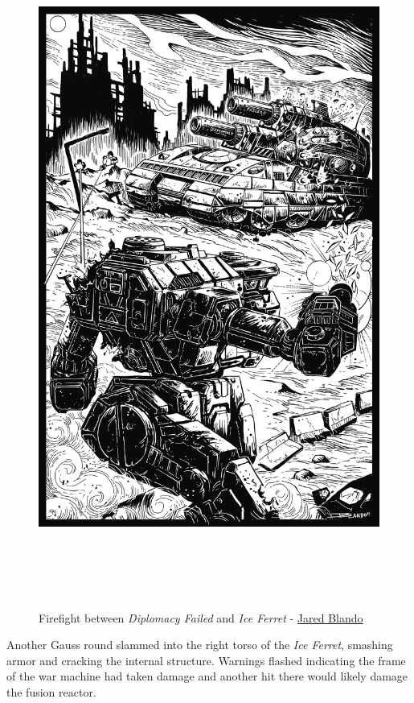 \begin{figure}[!h]
  \centering
  \href{https://jaredblando.com/}{\includegraphics[alt='Demolisher and Ice Ferret fighting', width=5.5in, height=8.5in]{img/Firefight.png}}
  \caption*{Firefight between \emph{Diplomacy Failed} and \emph{Ice Ferret} - \href{https://jaredblando.com/}{Jared Blando}}
\end{figure}

\newpage


Another Gauss round slammed into the right torso of the \emph{Ice Ferret}, smashing armor and cracking the internal structure.
Warnings flashed indicating the frame of the war machine had taken damage and another hit there would likely damage the fusion reactor.

